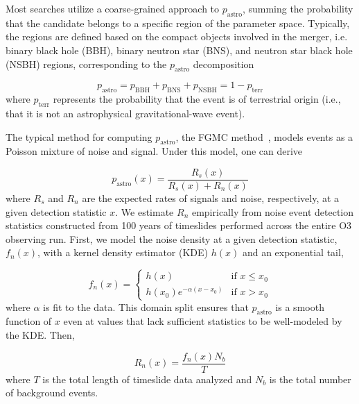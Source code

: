 \begin{refsection}
Most searches utilize a coarse-grained approach to $p_\mathrm{astro}$, summing the probability that the candidate belongs to a specific region of the parameter space.
Typically, the regions are defined based on the compact objects involved in the merger, i.e. binary black hole (BBH), binary neutron star (BNS), and neutron star black hole (NSBH) regions, corresponding to the $p_\mathrm{astro}$ decomposition 

\begin{equation}
    p_\mathrm{astro} = p_\mathrm{BBH} + p_\mathrm{BNS} + p_\mathrm{NSBH} = 1 - p_\mathrm{terr}
\end{equation}
where $p_\mathrm{terr}$ represents the probability that the event is of terrestrial origin (i.e., that it is not an astrophysical gravitational-wave event).


The typical method for computing $p_\mathrm{astro}$, the FGMC method~\cite{Farr_2015}, models events as a Poisson mixture of noise and signal. Under this model, one can derive

\begin{equation}
    p_\mathrm{astro}(x) = \frac{R_s(x)}{R_s(x) + R_n(x)}
\end{equation}
where $R_s$ and $R_n$ are the expected rates of signals and noise, respectively, at a given detection statistic $x$.
We estimate $R_n$ empirically from noise event detection statistics constructed from 100 years of timeslides performed across the entire O3 observing run. 
First, we model the noise density at a given detection statistic, $f_n(x)$, with a kernel density estimator (KDE) $h(x)$ and an exponential tail,

\begin{equation}
f_n(x)=
    \begin{cases}
        h(x) & \text{if } x \leq x_0 \\
        h(x_0) e^{-\alpha (x - x_0)} & \text{if } x > x_0
    \end{cases}
\end{equation}
where $\alpha$ is fit to the data. This domain split ensures that $p_\mathrm{astro}$ is a smooth function of $x$ even at values that lack sufficient statistics to be well-modeled by the KDE. 
Then,

\begin{equation}
    R_n(x) = \frac{f_n(x) N_b}{T}
\end{equation}
where $T$ is the total length of timeslide data analyzed and $N_b$ is the total number of background events.


\end{refsection}
